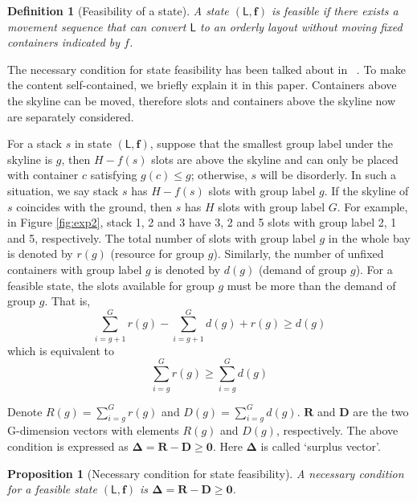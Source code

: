 \documentclass[review,3p,times,12pt,number]{elsarticle}\usepackage{amsmath}\usepackage{amssymb}
\newtheorem{proposition}{Proposition}
\newtheorem{definition}{Definition}
\renewcommand{\citet}[1]{\citeauthor{#1}~\citep{#1}}
\begin{document}
\begin{definition}[Feasibility of a state]
A state $(\mathsf{L},\boldsymbol{f})$ is feasible if there exists a movement sequence that can convert $\mathsf{L}$ to an orderly layout without moving fixed containers indicated by $f$.
\end{definition}

The necessary condition for state feasibility has been talked about in \citet{wang2014}. To make the content self-contained, we briefly explain it in this paper. Containers above the skyline can be moved, therefore slots and containers above the skyline now are separately considered.

For a stack $s$ in state $(\mathsf{L},\boldsymbol{f})$, suppose that the smallest group label under the skyline is $g$, then $H-f(s)$ slots are above the skyline and can only be placed with container $c$ satisfying $g(c)\le g$; otherwise, $s$ will be disorderly. In such a situation, we say stack $s$ has $H-f(s)$ slots with group label $g$.
If the skyline of $s$ coincides with the ground, then $s$ has $H$ slots with group label $G$.
For example, in Figure \ref{fig:exp2}, stack 1, 2 and 3 have 3, 2 and 5 slots with group label 2, 1 and 5, respectively. The total number of slots with group label $g$ in the whole bay is denoted by $r(g)$ (resource for group $g$).
Similarly, the number of unfixed containers with group label $g$ is denoted by $d(g)$ (demand of group $g$).
For a feasible state, the slots available for group $g$ must be more than the demand of group $g$. That is,
\begin{equation*}
\sum^G_{i=g+1}r(g)-\sum^G_{i=g+1}d(g)+r(g)\ge d(g)
\end{equation*}
which is equivalent to
\begin{equation*}
\sum^G_{i=g}r(g)\ge \sum^G_{i=g} d(g)
\end{equation*}

Denote $R(g)=\sum^G_{i=g}r(g)$ and $D(g)=\sum^G_{i=g}d(g)$. $\boldsymbol R$ and $\boldsymbol D$ are the two G-dimension vectors with elements $R(g)$ and $D(g)$, respectively. The above condition is expressed as $\boldsymbol{\Delta}=\boldsymbol{R}-\boldsymbol{D}\ge \boldsymbol{0}$. Here $\boldsymbol \Delta$ is called `surplus vector'.

\begin{proposition}[Necessary condition for state feasibility]
A necessary condition for a feasible state $(\mathsf{L},\boldsymbol{f})$ is $\boldsymbol{\Delta}=\boldsymbol{R}-\boldsymbol{D}\ge \boldsymbol{0}$.
\end{proposition}
\end{document}

